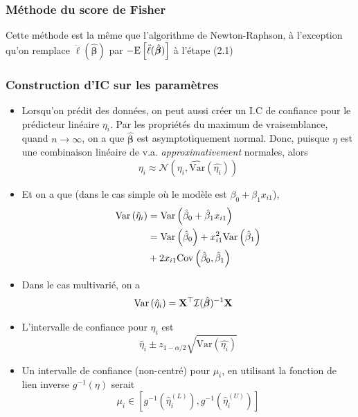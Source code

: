 \documentclass[10pt, french]{article}
\begin{document}
\begin{multicols*}{3}
\subsubsection*{Méthode du score de Fisher}

Cette méthode est la même que l'algorithme de Newton-Raphson, à l'exception qu'on remplace $\ddot{\ell}(\hat{\bm{\beta}})$ par $- \mathrm{E} \left[ \ddot{\ell}(\hat{\bm{\beta}}) \right]$ à l'étape (2.1)

\subsubsection*{Construction d'IC sur les paramètres}

\begin{itemize}
	\item	Lorsqu'on prédit des données, on peut aussi créer un I.C de confiance pour le prédicteur linéaire $\eta_i$. 
			Par les propriétés du maximum de vraisemblance, quand $n \to \infty$, on a que $\hat{\bm{\beta}}$ est asymptotiquement normal. 
			Donc, puisque $\eta$ est une combinaison linéaire de v.a. \emph{approximativement} normales, alors
		\[
			\eta_i \approx \mathcal{N} \left( \eta_i,  \widehat{\mathrm{Var}}(\hat{\eta_i}) \right) 
		\]
	
	\item	Et on a que (dans le cas simple où le modèle est $\beta_0 + \beta_1 x_{i1}$),
	\begin{align*}
		\mathrm{Var} \left( \hat{\eta}_i \right)	
		&= \mathrm{Var} \left( \hat{\beta}_0 + \hat{\beta}_1 x_{i1} \right) \\
		&= \mathrm{Var} \left( \hat{\beta}_0 \right) + x_{i1}^2 \mathrm{Var} \left( \hat{\beta}_1 \right)  \\
		&+ 2 x _{i1}  \mathrm{Cov} \left( \hat{\beta}_0, \hat{\beta}_1 \right)
	\end{align*}
	
	\item	Dans le cas multivarié, on a
	\begin{align*}
		\mathrm{Var} \left( \hat{\eta}_i \right)	 
			&= \mathbf{X}^{\top} \mathcal{I} (\hat{\bm{\beta}})^{-1} \mathbf{X}
	\end{align*}
	
	\item	L'intervalle de confiance  pour $\eta_i$ est
	\[
		\hat{\eta}_i \pm z_{1- \alpha/2} \sqrt{\widehat{\mathrm{Var}}(\hat{\eta_i})} 
	\]
	
	\item 	Un intervalle de confiance (non-centré) pour $\mu_i$, en utilisant la fonction de lien inverse $g^{-1}(\eta)$ serait
	\[ 
		\mu_i \in \left [ g^{-1} \left( \hat{\eta}_i^{(L)}\right),  g^{-1} \left( \hat{\eta}_i^{(U)} \right)      \right]   
	\]
	

\end{itemize}
\end{multicols*}
\end{document}

